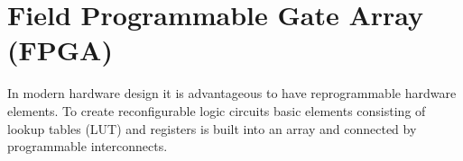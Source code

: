 
\chapter{Field Programmable Gate Array (FPGA)}
In modern hardware design it is advantageous to have reprogrammable hardware elements. To create reconfigurable logic circuits basic elements consisting of lookup tables (LUT) and registers is built into an array and connected by programmable interconnects. 

